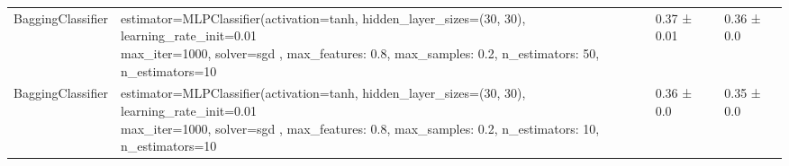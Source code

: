 \begin{tabular}{llll}
    \addlinespace[15pt]
    BaggingClassifier & \makecell[l]{estimator=MLPClassifier(activation=tanh,                                          hidden\_layer\_sizes=(30, 30),                                          learning\_rate\_init=0.01                                        \\                                         max\_iter=1000, solver=sgd , max\_features: 0.8, max\_samples: 0.2, n\_estimators: 50, n\_estimators=10} & 0.37 ± 0.01    & 0.36 ± 0.0          \\
    \addlinespace[15pt]
    BaggingClassifier & \makecell[l]{estimator=MLPClassifier(activation=tanh,                                          hidden\_layer\_sizes=(30, 30),                                          learning\_rate\_init=0.01                                        \\                                         max\_iter=1000, solver=sgd , max\_features: 0.8, max\_samples: 0.2, n\_estimators: 10, n\_estimators=10} & 0.36 ± 0.0     & 0.35 ± 0.0          \\

    \bottomrule
\end{tabular}
